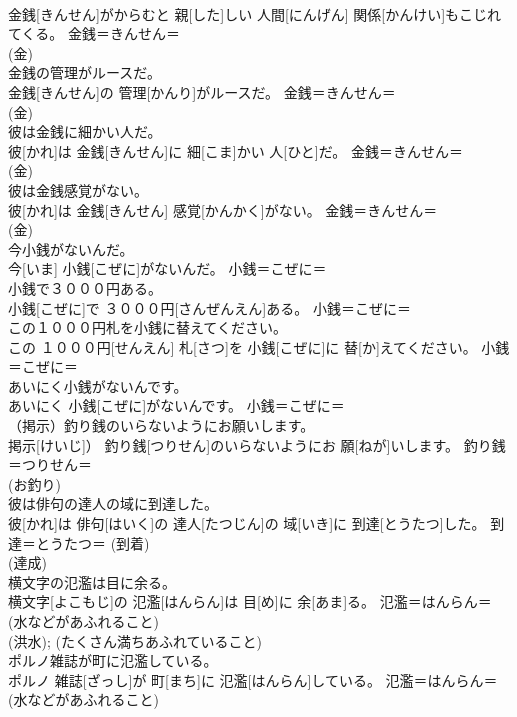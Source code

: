 \documentclass[8pt]{extreport}
\begin{document}
\begin{CJK}{UTF8}{min}
{\\	金銭[きんせん]がからむと 親[した]しい 人間[にんげん] 関係[かんけい]もこじれてくる。	金銭＝きんせん＝　
\\	(金)
\\	金銭の管理がルースだ。	
\\	金銭[きんせん]の 管理[かんり]がルースだ。	金銭＝きんせん＝　
\\	(金)
\\	彼は金銭に細かい人だ。	
\\	彼[かれ]は 金銭[きんせん]に 細[こま]かい 人[ひと]だ。	金銭＝きんせん＝　
\\	(金)
\\	彼は金銭感覚がない。	
\\	彼[かれ]は 金銭[きんせん] 感覚[かんかく]がない。	金銭＝きんせん＝　
\\	(金)
\\	今小銭がないんだ。	
\\	今[いま] 小銭[こぜに]がないんだ。	小銭＝こぜに＝ 
\\	小銭で３０００円ある。	
\\	小銭[こぜに]で ３０００円[さんぜんえん]ある。	小銭＝こぜに＝ 
\\	この１０００円札を小銭に替えてください。	
\\	この １０００円[せんえん] 札[さつ]を 小銭[こぜに]に 替[か]えてください。	小銭＝こぜに＝ 
\\	あいにく小銭がないんです。	
\\	あいにく 小銭[こぜに]がないんです。	小銭＝こぜに＝ 
\\	（掲示）釣り銭のいらないようにお願いします。	
\\	掲示[けいじ]） 釣り銭[つりせん]のいらないようにお 願[ねが]いします。	釣り銭＝つりせん＝ 
\\	(お釣り)
\\	彼は俳句の達人の域に到達した。	
\\	彼[かれ]は 俳句[はいく]の 達人[たつじん]の 域[いき]に 到達[とうたつ]した。	到達＝とうたつ＝ (到着) 
\\	(達成) 
\\	横文字の氾濫は目に余る。	
\\	横文字[よこもじ]の 氾濫[はんらん]は 目[め]に 余[あま]る。	氾濫＝はんらん＝ (水などがあふれること) 
\\	(洪水); (たくさん満ちあふれていること) 
\\	ポルノ雑誌が町に氾濫している。	
\\	ポルノ 雑誌[ざっし]が 町[まち]に 氾濫[はんらん]している。	氾濫＝はんらん＝ (水などがあふれること) 
}
\end{CJK}
\end{document}
